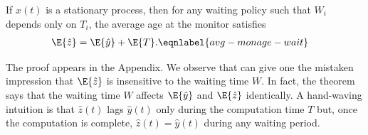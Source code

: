 \documentclass[conference, 10pt]{IEEEtran}
\newcommand{\maxage}{\hat{x}}
\newcommand{\dpage}{\hat{y}}
\newcommand{\monage}{\hat{z}}
\begin{document}


\begin{theorem} 
    If $\maxage(t)$ is a stationary process, 
    then for any  waiting policy such that $W_i$ depends only on $T_i$, the average age 
    at the monitor satisfies 
    \begin{align}
        \E{\monage} &= \E{\dpage} +\E{T}.  \eqnlabel{avg-monage-wait}
    \end{align}
\end{theorem}
The proof appears in the Appendix. We observe that   can give one the mistaken impression that $\E{\monage}$ is insensitive to the waiting time $W$. In fact, the theorem says that the waiting time $W$ affects $\E{\dpage}$ and $\E{\monage}$ identically. A hand-waving intuition is that $\monage(t)$ lags $\dpage(t)$ only during the computation time $T$ but, once the computation is complete, $\monage(t)=\dpage(t)$ during any waiting period. 
\end{document}
